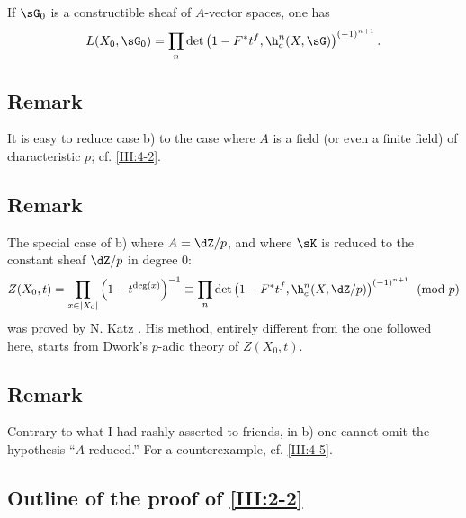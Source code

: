 If $\sG_0$ is a constructible sheaf of $A$-vector spaces, one has
\[
  L(X_0,\sG_0) = \prod_n \det\left(1-F^* t^f,\h_c^n(X,\sG)\right)^{(-1)^{n+1}} \text{.}
\]






\subsection{Remark}\label{III:2-5}

It is easy to reduce case b) to the case where $A$ is a field (or even a
finite field) of characteristic $p$; cf. \ref{III:4-2}.






\subsection{Remark}\label{III:2-6}

The special case of b) where $A=\dZ/p$, and where $\sK$ is reduced to the
constant sheaf $\dZ/p$ in degree $0$:
\[
  Z(X_0,t) = \prod_{x\in |X_0|} \left(1-t^{\deg(x)}\right)^{-1}
      \equiv \prod_n \det\left(1-F^* t^f,\h_c^n(X,\dZ/p)\right)^{(-1)^{n+1}} \pmod p
\]
was proved by N. Katz . His method, entirely different
from the one followed here, starts from Dwork's $p$-adic theory of
$Z(X_0,t)$.






\subsection{Remark}\label{III:2-7}


Contrary to what I had rashly asserted to friends, in b) one cannot omit the
hypothesis ``$A$ reduced.'' For a counterexample, cf. \ref{III:4-5}.






\subsection{Outline of the proof of \ref{III:2-2}}\label{III:2-8}

